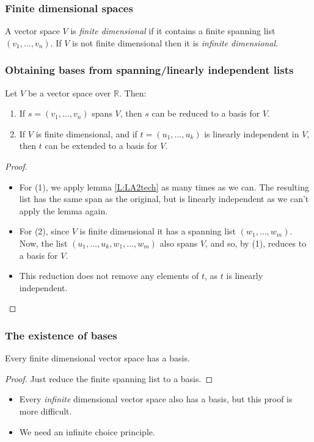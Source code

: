 \documentclass[handout]{beamer}
\newcommand{\bR}{\mathbb{R}}
\begin{document}
\begin{frame}
\frametitle{Finite dimensional spaces}
\begin{definition}
A vector space $V$ is \emph{finite dimensional} if it contains a finite spanning list $(v_1,\ldots,v_n)$. If $V$ is not finite dimensional then it is \emph{infinite dimensional}. 
\end{definition}
\end{frame}

\begin{frame}
\frametitle{Obtaining bases from spanning/linearly independent lists}
\begin{theorem}\label{T:LA2basis}
Let $V$ be a vector space over $\bR$. Then:
\begin{enumerate}
\item If $s = (v_1,\ldots,v_n)$ spans $V$, then $s$ can be reduced to a basis for $V$.
\item If $V$ is finite dimensional, and if $t=(u_1,\ldots,u_k)$ is linearly independent in $V$, then $t$ can be extended to a basis for $V$.
\end{enumerate}
\end{theorem}
\begin{proof}
\begin{itemize} 
\item For (1), we apply lemma \ref{L:LA2tech} as many times as we can. The resulting list has the same span as the original, but is linearly independent as we can't apply the lemma again. 

\item For (2), since $V$ is finite dimensional it has a spanning list $(w_1,\ldots,w_m)$. Now, the list $(u_1,\ldots,u_k,w_1,\ldots,w_m)$ also spans $V$, and so, by (1), reduces to a basis for $V$. \item This reduction does not remove any elements of $t$, as $t$ is linearly independent.
\end{itemize}
\end{proof}
\end{frame}

\begin{frame}
\frametitle{The existence of bases}
\begin{corollary}
Every finite dimensional vector space has a basis.
\end{corollary}
\begin{proof}
Just reduce the finite spanning list to a basis. 
\end{proof}
\vspace{1cm}
\begin{itemize}
\item Every \emph{infinite} dimensional vector space also has a basis, but this proof is more difficult.
\vspace{0.5cm}
\item We need an infinite choice principle. 
\end{itemize}
\end{frame}
\end{document}
